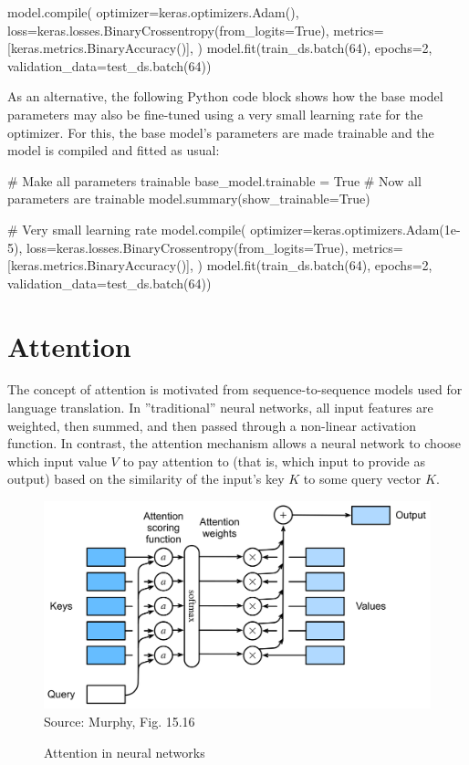 \begin{pythoncode}
model.compile(
    optimizer=keras.optimizers.Adam(),
    loss=keras.losses.BinaryCrossentropy(from_logits=True),
    metrics=[keras.metrics.BinaryAccuracy()],
)
model.fit(train_ds.batch(64), epochs=2, 
          validation_data=test_ds.batch(64))
\end{pythoncode}

As an alternative, the following Python code block shows how the base model parameters may also be fine-tuned using a very small learning rate for the optimizer. For this, the base model's parameters are made trainable and the model is compiled and fitted as usual:
\begin{pythoncode}
# Make all parameters trainable
base_model.trainable = True
# Now all parameters are trainable
model.summary(show_trainable=True)

# Very small learning rate
model.compile(
    optimizer=keras.optimizers.Adam(1e-5),
    loss=keras.losses.BinaryCrossentropy(from_logits=True),
    metrics=[keras.metrics.BinaryAccuracy()],
)
model.fit(train_ds.batch(64), epochs=2, 
          validation_data=test_ds.batch(64))
\end{pythoncode}

\section{Attention}

The concept of attention is motivated from sequence-to-sequence models used for language translation. In ''traditional'' neural networks, all input features are weighted, then summed, and then passed through a non-linear activation function. In contrast, the attention mechanism allows a neural network to choose which input value $V$ to pay attention to (that is, which input to provide as output) based on the similarity of the input's key $K$ to some query vector $K$. 

\begin{figure}
\centering
\includegraphics[width=.8\textwidth]{murphy_15_16.png} \\

\scriptsize Source: Murphy, Fig. 15.16 \normalsize
\caption{Attention in neural networks}
\label{fig:murphy_15_16}
\end{figure}

